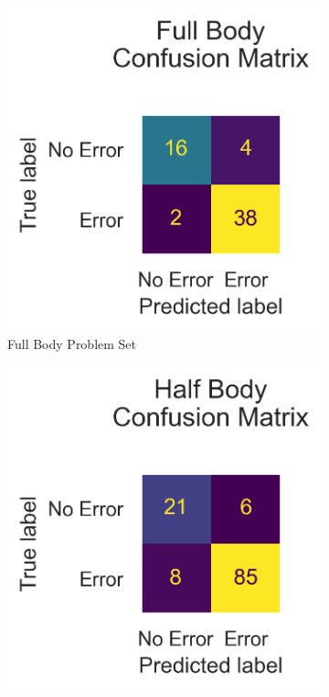 \begin{figure}[ht]
  \centering
  \begin{subfigure}[b]{0.47\linewidth}
      \centering
      \includegraphics[width=\textwidth]{figures/Results/v1_bs_60_is_64_e_100/confusion/full_together.png}
      \caption[]{Full Body Problem Set}
      \label{fig:fb_conf_v1}
  \end{subfigure}
  \hfill
  \begin{subfigure}[b]{0.47\linewidth}
      \centering
      \includegraphics[width=\textwidth]{figures/Results/v1_bs_60_is_64_e_100/confusion/half_together.png}

\end{subfigure}
\end{figure}
